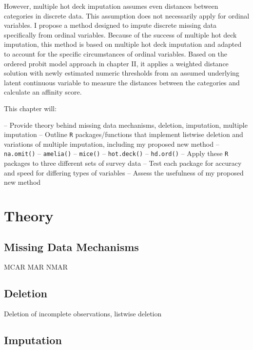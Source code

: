 \documentclass[12pt,econ]{sources/authesis}
\begin{document}
However, multiple hot deck imputation assumes even distances between categories in discrete data. This assumption does not necessarily apply for ordinal variables. I propose a method designed to impute discrete missing data specifically from ordinal variables. Because of the success of multiple hot deck imputation, this method is based on multiple hot deck imputation and adapted to account for the specific circumstances of ordinal variables. Based on the ordered probit model approach in chapter II, it applies a weighted distance solution with newly estimated numeric thresholds from an assumed underlying latent continuous variable to measure the distances between the categories and calculate an affinity score.

This chapter will:

-- Provide theory behind missing data mechanisms, deletion, imputation, multiple imputation
-- Outline \texttt{R} packages/functions that implement listwise deletion and variations of multiple imputation, including my proposed new method
-- \texttt{na.omit()}
-- \texttt{amelia()}
-- \texttt{mice()}
-- \texttt{hot.deck()}
-- \texttt{hd.ord()}
-- Apply these \texttt{R} packages to three different sets of survey data
-- Test each package for accuracy and speed for differing types of variables
-- Assess the usefulness of my proposed new method

\hypertarget{ordmiss-theory}{%
\section{Theory}\label{ordmiss-theory}}

\hypertarget{ordmiss-theory-mechanisms}{%
\subsection{Missing Data Mechanisms}\label{ordmiss-theory-mechanisms}}

MCAR
MAR
NMAR

\hypertarget{ordmiss-theory-delete}{%
\subsection{Deletion}\label{ordmiss-theory-delete}}

Deletion of incomplete observations, listwise deletion

\hypertarget{ordmiss-theory-impute}{%
\subsection{Imputation}\label{ordmiss-theory-impute}}
\end{document}
